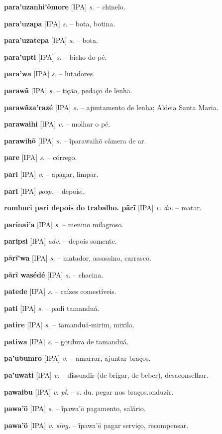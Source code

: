 \textbf{para'uzanhi'õmore} [IPA] \textit{s.} -- chinelo.

\textbf{para'uzapa} [IPA] \textit{s.} -- bota, botina.

\textbf{para'uzatepa} [IPA] \textit{s.} -- bota.

\textbf{para'upti} [IPA] \textit{s.} -- bicho do pé.

\textbf{para'wa} [IPA] \textit{s.} -- lutadores.

\textbf{parawã} [IPA] \textit{s.} -- tição, pedaço de lenha.

\textbf{parawãza'razé} [IPA] \textit{s.} -- ajuntamento de lenha; Aldeia Santa Maria.

\textbf{parawaihi} [IPA] \textit{v.} -- molhar o pé.

\textbf{parawihõ} [IPA] \textit{s.} -- ĩparawaihõ câmera de ar.

\textbf{pare} [IPA] \textit{s.} -- córrego.

\textbf{pari} [IPA] \textit{v.} -- apagar, limpar.

\textbf{pari} [IPA] \textit{posp.} -- depois;.

\textbf{romhuri pari depois do trabalho. pãrĩ} [IPA] \textit{v. du.} -- matar.

\textbf{parinai'a} [IPA] \textit{s.} -- menino milagroso.

\textbf{paripsi} [IPA] \textit{adv.} -- depois somente.

\textbf{pãrĩ'wa} [IPA] \textit{s.} -- matador, assassino, carrasco.

\textbf{pãrĩ wasédé} [IPA] \textit{s.} -- chacina.

\textbf{patede} [IPA] \textit{s.} -- raízes comestíveis.

\textbf{pati} [IPA] \textit{s.} -- padi tamanduá.

\textbf{patire} [IPA] \textit{s.} -- tamanduá-mirim, mixila.

\textbf{patiwa} [IPA] \textit{s.} -- gordura de tamanduá.

\textbf{pa'ubumro} [IPA] \textit{v.} -- amarrar, ajuntar braços.

\textbf{pa'uwati} [IPA] \textit{v.} -- dissuadir (de brigar, de beber), desaconselhar.

\textbf{pawaibu} [IPA] \textit{v. pl.} -- s. du. pegar nos braços.onduzir.

\textbf{pawa'ö} [IPA] \textit{s.} -- ĩpawa'ö pagamento, salário.

\textbf{pawa'ö} [IPA] \textit{v. sing.} -- ĩpawa'ö pagar serviço, recompensar.

